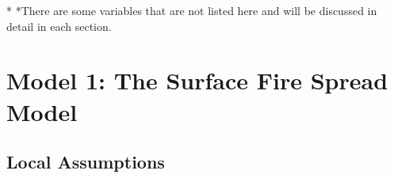 \documentclass[12pt]{article}  %
\begin{document}
\begin{table}[htbp]
\begin{center}
\begin{tabular}{m{1.5cm} m{12.1cm}}
			\bottomrule[2pt]
		\end{tabular}
		\label{tab2}
		
		\begin{tablenotes}
			\footnotesize
			\item[*] *There are some variables that are not listed here and will be discussed in detail in each section. %
		\end{tablenotes}
	\end{center}
\end{table}



\section{Model 1: The Surface Fire Spread Model}
\subsection{Local Assumptions}
\end{document}
